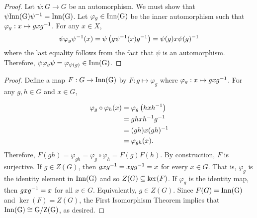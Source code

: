 \documentclass[../AlgebraQualSolutions.tex]{subfiles}
\begin{document}
\begin{proof}
    Let $\psi: G\to G$ be an automorphism. We must show that $\psi \rm{Inn}(G) \psi^{-1} = \rm{Inn}(G)$. Let $\varphi_g \in \rm{Inn}(G)$ be the inner automorphism such that $\varphi_g: x \mapsto gxg^{-1}$. For any $x \in X$,
            \[\psi\varphi_g\psi^{-1}(x) = \psi\left(g\psi^{-1}(x)g^{-1}\right) = \psi(g)x\psi(g)^{-1}\]
    where the last equality follows from the fact that $\psi$ is an automorphism. Therefore, $\psi\varphi_g\psi = \varphi_{\psi(g)} \in \rm{Inn}(G)$.
\end{proof}

\begin{proof}
    Define a map $F: G \to \rm{Inn}(G)$ by $F: g \mapsto \varphi_g$ where $\varphi_g: x \mapsto gxg^{-1}$. For any $g,h \in G$ and $x \in G$,

        \begin{align*}
            \varphi_g\circ\varphi_h(x) &= \varphi_g\left(hxh^{-1}\right)\\
            &= ghxh^{-1} g^{-1}\\
            &= (gh)x(gh)^{-1}\\
            &= \varphi_{gh}(x).
        \end{align*}
    Therefore, $F(gh) = \varphi_{gh} = \varphi_g\circ \varphi_h = F(g)F(h)$. By construction, $F$ is surjective. If $g \in Z(G)$, then $gxg^{-1} = xgg^{-1} = x$ for every $x \in G$. That is, $\varphi_g$ is the identity element in $\rm{Inn}(G)$ and so $Z(G) \subseteq \ker(F)$. If $\varphi_g$ is the identity map, then $gxg^{-1} = x$ for all $x \in G$. Equivalently, $g \in Z(G)$. Since $F(G) = \rm{Inn}(G)$ and $\ker(F) = Z(G)$, the First Isomorphism Theorem implies that $\rm{Inn}(G) \cong G/Z(G)$, as desired.
\end{proof}
\end{document}
